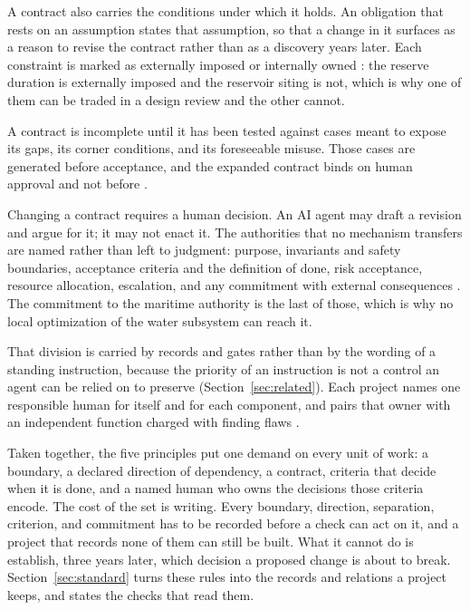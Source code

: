 A contract also carries the conditions under which it holds. An obligation that rests on an assumption states that assumption, so that a change in it surfaces as a reason to revise the contract rather than as a discovery years later. Each constraint is marked as externally imposed or internally owned \citep[Sections~\hyperlink{nss-6.5}{6.5} and~\hyperlink{nss-6.8}{6.8}]{pss2026}: the reserve duration is externally imposed and the reservoir siting is not, which is why one of them can be traded in a design review and the other cannot.

A contract is incomplete until it has been tested against cases meant to expose its gaps, its corner conditions, and its foreseeable misuse. Those cases are generated before acceptance, and the expanded contract binds on human approval and not before \citep[Section~\hyperlink{nss-6.14}{6.14}]{pss2026}.

Changing a contract requires a human decision. An AI agent may draft a revision and argue for it; it may not enact it. The authorities that no mechanism transfers are named rather than left to judgment: purpose, invariants and safety boundaries, acceptance criteria and the definition of done, risk acceptance, resource allocation, escalation, and any commitment with external consequences \citep[Sections~\hyperlink{nss-1.3}{1.3} and~\hyperlink{nss-15.2}{15.2}]{pss2026}. The commitment to the maritime authority is the last of those, which is why no local optimization of the water subsystem can reach it.

That division is carried by records and gates rather than by the wording of a standing instruction, because the priority of an instruction is not a control an agent can be relied on to preserve (Section~\ref{sec:related}). Each project names one responsible human for itself and for each component, and pairs that owner with an independent function charged with finding flaws \citep[Section~\hyperlink{nss-15.1}{15.1}]{pss2026}.

Taken together, the five principles put one demand on every unit of work: a boundary, a declared direction of dependency, a contract, criteria that decide when it is done, and a named human who owns the decisions those criteria encode. The cost of the set is writing. Every boundary, direction, separation, criterion, and commitment has to be recorded before a check can act on it, and a project that records none of them can still be built. What it cannot do is establish, three years later, which decision a proposed change is about to break. Section~\ref{sec:standard} turns these rules into the records and relations a project keeps, and states the checks that read them.
